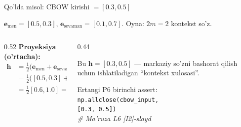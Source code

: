 \documentclass[aspectratio=169,11pt]{beamer}
\begin{document}
%
\begin{frame}{Qo'lda misol: CBOW kirishi $=[0.3,0.5]$}
  \begin{tcolorbox}[defbox,title={Kontekst (men, sevaman); markaz nlp; dim=2}]
    \small
    $\mathbf{e}_{\text{men}}=[0.5,0.3]$, \quad
    $\mathbf{e}_{\text{sevaman}}=[0.1,0.7]$. \quad Oyna: $2m=2$ kontekst so'z.
  \end{tcolorbox}
  \vspace{0.2em}
  \begin{columns}[T]
    \begin{column}{0.52\textwidth}
      \textbf{Proyeksiya (o'rtacha):}
      \begin{align*}
        \mathbf{h} &= \tfrac{1}{2}\big(\mathbf{e}_{\text{men}}+\mathbf{e}_{\text{sevaman}}\big)\\
          &= \tfrac{1}{2}\big([0.5,0.3]+[0.1,0.7]\big)\\
          &= \tfrac{1}{2}[0.6,1.0] = \mathbf{[0.3,\,0.5]}
      \end{align*}
    \end{column}
    \begin{column}{0.44\textwidth}
      \begin{tcolorbox}[okbox,top=2pt,bottom=2pt]
        \footnotesize
        Bu $\mathbf{h}=[0.3,0.5]$ --- markaziy so'zni bashorat qilish uchun
        ishlatiladigan ``kontekst xulosasi''.
      \end{tcolorbox}
      \vspace{3pt}
      \footnotesize\color{halfgray}
      Ertangi P6 birinchi assert:\\
      \texttt{np.allclose(cbow\_input,}\\
      \texttt{\phantom{xx}[0.3, 0.5])}\\
      \textit{\# Ma'ruza L6 [I2]-slayd}
    \end{column}
  \end{columns}
\end{frame}
\end{document}
